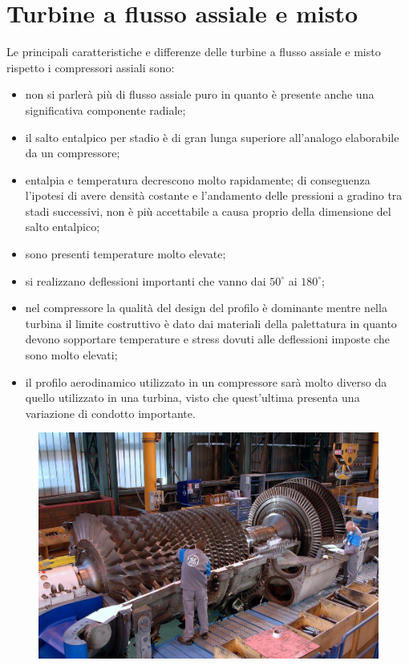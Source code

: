 \chapter{Turbine a flusso assiale e misto}
Le principali caratteristiche e differenze delle turbine a flusso assiale e misto rispetto i compressori assiali sono:
\begin{itemize}
	\item non si parlerà più di flusso assiale puro in quanto è presente anche una significativa componente radiale;
	\item il salto entalpico per stadio è di gran lunga superiore all'analogo elaborabile da un compressore;	
	\item entalpia e temperatura decrescono molto rapidamente; di conseguenza l'ipotesi di avere densità costante e l'andamento delle pressioni a gradino tra stadi successivi, non è più accettabile a causa proprio della dimensione del salto entalpico;
	\item sono presenti temperature molto elevate;
	\item si realizzano deflessioni importanti che vanno dai $50^{\circ}$ ai $180^{\circ}$;
	\item nel compressore la qualità del design del profilo è dominante mentre nella turbina il limite costruttivo è dato dai materiali della palettatura in quanto devono sopportare temperature e stress dovuti alle deflessioni imposte che sono molto elevati;
	\item il profilo aerodinamico utilizzato in un compressore sarà molto diverso da quello utilizzato in una turbina, visto che quest'ultima presenta una variazione di condotto importante.
\end{itemize}
\begin{figure}[h!]
\centering
  \includegraphics[width=.9\textwidth]{fig/TurboGas.png}
\caption{}
\label{fig:TurboGas}
\end{figure}

